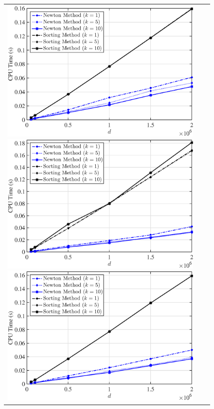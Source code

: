 \documentclass[journal]{IEEEtran}
\begin{document}
\begin{figure}[!htb]
	\begin{tabular}{ccc}
		\begin{minipage}[t]{0.32\linewidth}
			\includegraphics[width = 1\linewidth]{scale1.eps}
		\end{minipage}
	\begin{minipage}[t]{0.32\linewidth}
		\includegraphics[width = 1\linewidth]{scale2.eps}
	\end{minipage}
		\begin{minipage}[t]{0.32\linewidth}
			\includegraphics[width = 1\linewidth]{scale3.eps}

\end{minipage}
\end{tabular}
\end{figure}
\end{document}
